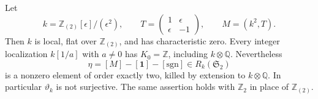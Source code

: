 \begin{proposition}
\label{C:flat_nilpotent_kernel}
Let
\[
 k=\mathbb Z_{(2)}[\epsilon]/(\epsilon^2),\qquad
 T=\begin{pmatrix}1&\epsilon\\\epsilon&-1\end{pmatrix},
 \qquad M=(k^2,T).
\]
Then $k$ is local, flat over $\mathbb Z_{(2)}$, and has characteristic
zero. Every integer localization $k[1/a]$ with $a\ne0$ has $K_0=\mathbb Z$,
including $k\otimes\mathbb Q$.
Nevertheless
\[
 \eta=[M]-[\mathbf1]-[\mathrm{sgn}]
       \in R_k(\mathfrak S_2)                              \tag{C.1.6}
\]
is a nonzero element of order exactly two, killed by extension to
$k\otimes\mathbb Q$. In particular $\vartheta_k$ is not surjective.
The same assertion holds with $\mathbb Z_2$ in place of
$\mathbb Z_{(2)}$.
\end{proposition}
